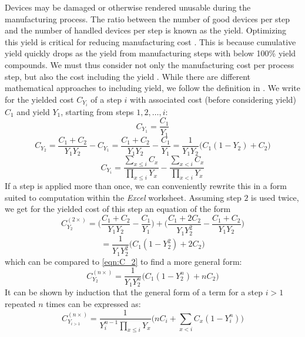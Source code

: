 \documentclass[parskip=full]{article}
\begin{document}
Devices may be damaged or otherwise rendered unusable during the manufacturing process. The ratio between the number of good devices per step and the number of handled devices per step is known as the yield. Optimizing this yield is critical for reducing manufacturing cost \cite{Kumar2006}. This is because cumulative yield quickly drops as the yield from manufacturing steps with below 100\% yield compounds. We must thus consider not only the manufacturing cost per process step, but also the cost including the yield \cite{becker2001use}\cite{becker2001using}. While there are different mathematical approaches to including yield, we follow the definition in \cite{becker2001use}. We write for the yielded cost $C_{Y_i}$ of a step $i$ with associated cost (before considering yield) $C_1$ and yield $Y_1$, starting from steps $1,2,\dots,i$:
%
\begin{equation}
\label{eqn:C_2}
    C_{Y_1} = \frac{C_1}{Y_1}
\end{equation}
\begin{equation}
    C_{Y_2} = \frac{C_1 + C_2}{Y_1 Y_2} - C_{Y_1} = \frac{C_1 + C_2}{Y_1 Y_2} - \frac{C_1}{Y_1} = \frac{1}{Y_1 Y_2} \bigg ( C_1 (1-Y_2) +C_2 \bigg)
\end{equation}
\begin{equation}
    C_{Y_i} = \frac{ \sum_{x \leq i} C_x }{ \prod_{x \leq i} Y_x } - \frac{ \sum_{x<i} C_x }{ \prod_{x<i} Y_x }
\end{equation}
%
If a step is applied more than once, we can conveniently rewrite this in a form suited to computation within the \textit{Excel} worksheet. Assuming step $2$ is used twice, we get for the yielded cost of this step an equation of the form
%
\begin{equation}
\label{eqn:C_2^2}
    C_{Y_2}^{(2 \times)} = \bigg( \frac{C_1 + C_2}{Y_1 Y_2} - \frac{C_1}{Y_1} \bigg) + \bigg( \frac{C_1 + 2 C_2}{Y_1 Y_2^2} - \frac{C_1 + C_2}{Y_1 Y_2}     \bigg)
\end{equation}
%
\begin{equation}
    = \frac{1}{Y_1 Y_2^2} \bigg( C_1 (1-Y_2^2) +2C_2 \bigg)
\end{equation}
%
which can be compared to  \cref{eqn:C_2} to find a more general form:
%
\begin{equation}
    C_{Y_2}^{(n \times)} = \frac{1}{Y_1 Y_2^n} \bigg( C_1 (1-Y_2^n)+nC_2\bigg)
\end{equation}
%
It can be shown by induction that the general form of a term for a step $i>1$ repeated $n$ times can be expressed as:
%
\begin{equation}
\label{eqn:yielded_cost}
    C_{Y_{i>1}}^{(n \times)} = \frac{1}{Y_i^{n-1} \prod_{x \leq i} Y_x} \bigg( nC_i + \sum_{x < i} C_x (1-Y_i^n) \bigg)
\end{equation}
\end{document}
